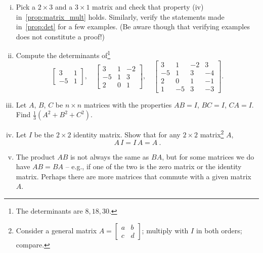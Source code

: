 \begin{exercise}
\begin{enumerate}[(i)]
	\item Pick a $2 \times 3$ and a $3 \times 1$ matrix and check that property (iv) in~\ref{prop:matrix_mult} holds. Similarly, verify the statements made in~\ref{prop:det} for a few examples. (Be aware though that verifying examples does not constitute a proof!)
	\item Compute the determinants of\footnote{The determinants are $8,18,30$.}
	\[ \begin{bmatrix} 3 & 1 \\ -5 & 1 \end{bmatrix}, \quad
	\begin{bmatrix}	3 & 1 & -2 \\ -5 & 1 & 3 \\ 2 & 0 & 1 \end{bmatrix}, \quad
	\begin{bmatrix}
	3 & 1 & -2 & 3 \\ -5 & 1 & 3 & -4 \\ 2 & 0 & 1 & -1 \\ 1 & -5 & 3 & -3 
	\end{bmatrix} . \]
	\item Let $A$, $B$, $C$ be $n \times n$ matrices with the properties $AB=I$, $BC=I$, $CA=I$. Find $\tfrac13\left(A^2+B^2+C^2\right)$.
	\item Let $I$ be the $2 \times 2$ identity matrix. Show that for any $2 \times 2$ matrix\footnote{Consider a general matrix $A = \begin{bmatrix} a & b \\ c & d \end{bmatrix}$; multiply with $I$ in both orders; compare.} $A$, \[A \, I = I \, A = A\:.\] 
	\item The product $AB$ is not always the same as $BA$, but for some matrices we do have $AB=BA$ -- e.g., if one of the two is the zero matrix or the identity matrix. Perhaps there are more matrices that commute with a given matrix~$A$.
	

\end{enumerate}
\end{exercise}
